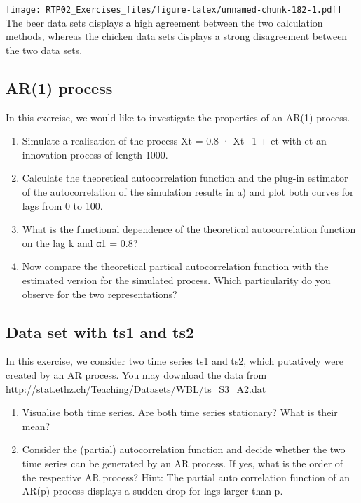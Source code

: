 \documentclass[
]{article}
\begin{document}
\texttt{[image: RTP02\_Exercises\_files/figure-latex/unnamed-chunk-182-1.pdf]}
The beer data sets displays a high agreement between the two calculation
methods, whereas the chicken data sets displays a strong disagreement
between the two data sets.

\hypertarget{ar1-process}{%
\subsection{AR(1) process}\label{ar1-process}}

In this exercise, we would like to investigate the properties of an
AR(1) process.

\begin{enumerate}
\def\labelenumi{\alph{enumi})}
\item
  Simulate a realisation of the process Xt = 0.8 · Xt−1 + et with et an
  innovation process of length 1000.
\item
  Calculate the theoretical autocorrelation function and the plug-in
  estimator of the autocorrelation of the simulation results in a) and
  plot both curves for lags from 0 to 100.
\item
  What is the functional dependence of the theoretical autocorrelation
  function on the lag k and α1 = 0.8?
\item
  Now compare the theoretical partical autocorrelation function with the
  estimated version for the simulated process. Which particularity do
  you observe for the two representations?
\end{enumerate}

\hypertarget{data-set-with-ts1-and-ts2}{%
\subsection{Data set with ts1 and ts2}\label{data-set-with-ts1-and-ts2}}

In this exercise, we consider two time series ts1 and ts2, which
putatively were created by an AR process. You may download the data from
\url{http://stat.ethz.ch/Teaching/Datasets/WBL/ts_S3_A2.dat}

\begin{enumerate}
\def\labelenumi{\alph{enumi})}
\item
  Visualise both time series. Are both time series stationary? What is
  their mean?
\item
  Consider the (partial) autocorrelation function and decide whether the
  two time series can be generated by an AR process. If yes, what is the
  order of the respective AR process? Hint: The partial auto correlation
  function of an AR(p) process displays a sudden drop for lags larger
  than p.
\end{enumerate}
\end{document}
